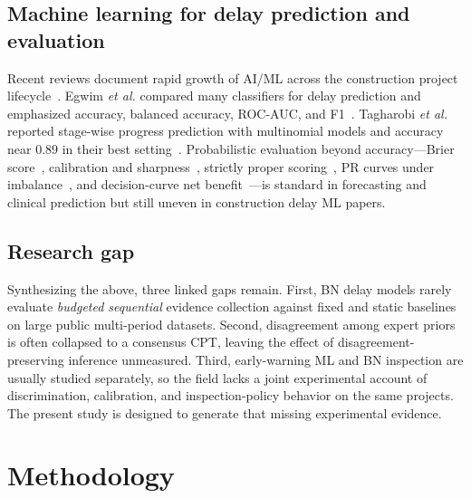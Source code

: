 \documentclass[journal]{IEEEtran}
\begin{document}
\subsection{Machine learning for delay prediction and evaluation}
Recent reviews document rapid growth of AI/ML across the construction project lifecycle~\cite{PanYZhang2021,Darko2020,Abioye2021,Regona2024}. Egwim \textit{et al.} compared many classifiers for delay prediction and emphasized accuracy, balanced accuracy, ROC-AUC, and F1~\cite{Egwim2021}. Tagharobi \textit{et al.} reported stage-wise progress prediction with multinomial models and accuracy near $0.89$ in their best setting~\cite{Tagharobi2025}. Probabilistic evaluation beyond accuracy---Brier score~\cite{Brier1950,Murphy1973}, calibration and sharpness~\cite{Gneiting2007}, strictly proper scoring~\cite{GneitingRaftery2007}, PR curves under imbalance~\cite{Saito2015}, and decision-curve net benefit~\cite{Vickers2006}---is standard in forecasting and clinical prediction but still uneven in construction delay ML papers.




\subsection{Research gap}
Synthesizing the above, three linked gaps remain. First, BN delay models rarely evaluate \emph{budgeted sequential} evidence collection against fixed and static baselines on large public multi-period datasets. Second, disagreement among expert priors is often collapsed to a consensus CPT, leaving the effect of disagreement-preserving inference unmeasured. Third, early-warning ML and BN inspection are usually studied separately, so the field lacks a joint experimental account of discrimination, calibration, and inspection-policy behavior on the same projects. The present study is designed to generate that missing experimental evidence.

\section{Methodology}
\label{sec:method}
\end{document}
